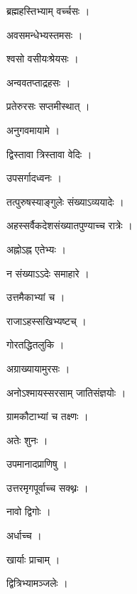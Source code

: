 \documentclass[10pt, openany]{book}
\begin{document}
\noindent ब्रह्महस्तिभ्याम् वर्च्चसः ।

\noindent अवसमन्धेभ्यस्तमसः ।

\noindent श्वसो वसीयःश्रेयसः ।

\noindent अन्ववतप्ताद्रहसः ।

\noindent प्रतेरुरसः सप्तमीस्थात् ।

\noindent अनुगवमायामे ।

\noindent द्विस्तावा त्रिस्तावा वेदिः ।

\noindent उपसर्गादध्वनः ।

\noindent तत्पुरुषस्याङ्गुलेः संख्याऽव्ययादेः ।

\noindent अहस्सर्वैकदेशसंख्यातपुण्याच्च रात्रेः ।

\noindent अह्नोऽह्न एतेभ्यः ।

\noindent न संख्याऽऽदेः समाहारे ।

\noindent उत्तमैकाभ्यां च ।

\noindent राजाऽहस्सखिभ्यष्टच् ।

\noindent गोरतद्धितलुकि ।

\noindent अग्राख्यायामुरसः ।

\noindent अनोऽश्मायस्सरसाम् जातिसंज्ञयोः ।

\noindent ग्रामकौटाभ्यां च तक्ष्णः ।

\noindent अतेः शुनः ।

\noindent उपमानादप्राणिषु ।

\noindent उत्तरमृगपूर्वाच्च सक्थ्नः ।

\noindent नावो द्विगोः ।

\noindent अर्धाच्च ।

\noindent खार्याः प्राचाम् ।

\noindent द्वित्रिभ्यामञ्जलेः ।
\end{document}
